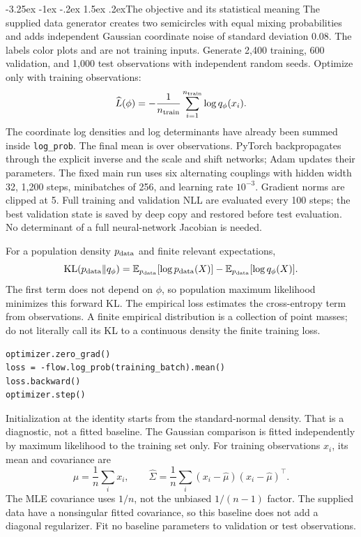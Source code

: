 \documentclass[11pt,a4paper]{article}
\makeatletter
\newcommand{\E}{\mathbb E}
\newcommand{\KL}{\operatorname{KL}}
\renewcommand\subsection{\@startsection{subsection}{2}{\z@}%
  {-3.25ex \@plus -1ex \@minus -.2ex}%
  {1.5ex \@plus .2ex}{\normalfont\large}}
\makeatother
\begin{document}
\subsection{The objective and its statistical meaning}
The supplied data generator creates two semicircles with equal mixing
probabilities and adds independent Gaussian coordinate noise of standard
deviation 0.08. The labels color plots and are not training inputs. Generate
2,400 training, 600 validation, and 1,000 test observations with independent
random seeds. Optimize only with training observations:
\[
 \widehat L(\phi)=-\frac1{n_{\rm train}}
   \sum_{i=1}^{n_{\rm train}}\log q_\phi(x_i).
\]
The coordinate log densities and log determinants have already been summed
inside \texttt{log\_prob}. The final mean is over observations. PyTorch
backpropagates through the explicit inverse and the scale and shift networks;
Adam updates their parameters. The fixed main run uses six alternating
couplings with hidden width 32, 1,200 steps, minibatches of 256, and learning
rate $10^{-3}$. Gradient norms are clipped at 5. Full training and validation
NLL are evaluated every 100 steps; the best validation state is saved by deep
copy and restored before test evaluation. No determinant of a full
neural-network Jacobian is needed.

For a population density $p_{\rm data}$ and finite relevant expectations,
\[
 \KL(p_{\rm data}\Vert q_\phi)
 =\E_{p_{\rm data}}[\log p_{\rm data}(X)]
  -\E_{p_{\rm data}}[\log q_\phi(X)].
\]
The first term does not depend on $\phi$, so population maximum likelihood
minimizes this forward KL. The empirical loss estimates the cross-entropy
term from observations. A finite empirical distribution is a collection of
point masses; do not literally call its KL to a continuous density the
finite training loss.

\begin{lstlisting}
optimizer.zero_grad()
loss = -flow.log_prob(training_batch).mean()
loss.backward()
optimizer.step()
\end{lstlisting}

Initialization at the identity starts from the standard-normal density.
That is a diagnostic, not a fitted baseline. The Gaussian comparison is
fitted independently by maximum likelihood to the training set only.
For training observations $x_i$, its mean and covariance are
\[
 \widehat\mu=\frac1n\sum_i x_i,\qquad
 \widehat\Sigma=\frac1n\sum_i(x_i-\widehat\mu)(x_i-\widehat\mu)^\top.
\]
The MLE covariance uses $1/n$, not the unbiased $1/(n-1)$ factor. The supplied data have a nonsingular fitted covariance, so this baseline
does not add a diagonal regularizer. Fit no baseline parameters to validation
or test observations.
\end{document}
